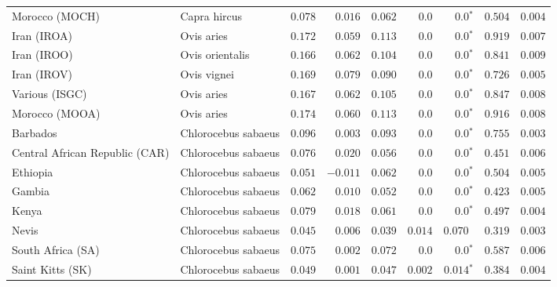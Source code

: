 \begin{center}
\begin{adjustbox}{width = 1\textwidth}
\begin{tabular}{|l|l|r|r|r|r|r|r|r|}
            Morocco (MOCH)                    & Capra hircus     & $ 0.078$ & $ 0.016$ & $ 0.062$ & $0.0$    & $\bm{0.0{^*}}$    & $ 0.504$ & $ 0.004$ \\
            Iran (IROA)                    & Ovis aries         & $ 0.172$ & $ 0.059$ & $ 0.113$ & $0.0$    & $\bm{0.0{^*}}$    & $ 0.919$ & $ 0.007$ \\
            Iran (IROO)                 & Ovis orientalis          & $ 0.166$ & $ 0.062$ & $ 0.104$ & $0.0$    & $\bm{0.0{^*}}$    & $ 0.841$ & $ 0.009$ \\
            Iran (IROV)                 & Ovis vignei          & $ 0.169$ & $ 0.079$ & $ 0.090$ & $0.0$    & $\bm{0.0{^*}}$    & $ 0.726$ & $ 0.005$ \\
            Various (ISGC)                       & Ovis aries & $ 0.167$ & $ 0.062$ & $ 0.105$ & $0.0$    & $\bm{0.0{^*}}$    & $ 0.847$ & $ 0.008$ \\
            Morocco (MOOA) & Ovis aries & $ 0.174$ & $ 0.060$ & $ 0.113$ & $0.0$ & $\bm{0.0{^*}}$ & $ 0.916$ & $ 0.008$ \\
            Barbados                       & Chlorocebus sabaeus & $ 0.096$ & $ 0.003$ & $ 0.093$ & $0.0$    & $\bm{0.0{^*}}$    & $ 0.755$ & $ 0.003$ \\
            Central African Republic (CAR)                         & Chlorocebus sabaeus & $ 0.076$ & $ 0.020$ & $ 0.056$ & $0.0$    & $\bm{0.0{^*}}$    & $ 0.451$ & $ 0.006$ \\
            Ethiopia                          & Chlorocebus sabaeus & $ 0.051$ & $-0.011$ & $ 0.062$ & $0.0$    & $\bm{0.0{^*}}$    & $ 0.504$ & $ 0.005$ \\
            Gambia                          & Chlorocebus sabaeus & $ 0.062$ & $ 0.010$ & $ 0.052$ & $0.0$ & $\bm{0.0{^*}}$        & $ 0.423$ & $ 0.005$ \\
            Kenya              & Chlorocebus sabaeus & $ 0.079$ & $ 0.018$ & $ 0.061$ & $0.0$    & $\bm{0.0{^*}}$ & $ 0.497$ & $ 0.004$ \\
            Nevis               & Chlorocebus sabaeus & $ 0.045$ & $ 0.006$ & $ 0.039$ & $ 0.014$ & $ 0.070~~$ & $ 0.319$ & $ 0.003$ \\
            South Africa (SA)                         & Chlorocebus sabaeus & $ 0.075$ & $ 0.002$ & $ 0.072$ & $0.0$    & $\bm{0.0{^*}}$    & $ 0.587$ & $ 0.006$ \\
            Saint Kitts (SK)                  & Chlorocebus sabaeus        & $ 0.049$ & $ 0.001$ & $ 0.047$ & $ 0.002$ & $\bm{ 0.014{^*}}$        & $ 0.384$ & $ 0.004$ \\

\end{tabular}
\end{adjustbox}
\end{center}
